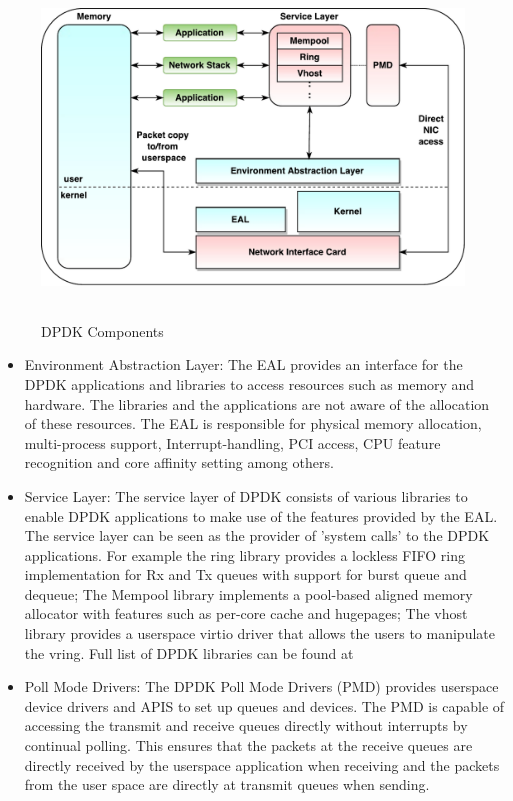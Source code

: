  \begin{figure}[H]
	\centering
	\caption{DPDK Components}
	\includegraphics[height=9cm]{DPDK.pdf}
\end{figure}

\begin{itemize}
	\item Environment Abstraction Layer: The EAL provides an interface for the DPDK applications and libraries to access resources such as memory and hardware. The libraries and the applications are not aware of the allocation of these resources. The EAL is responsible for physical memory allocation, multi-process support, Interrupt-handling, PCI access, CPU feature recognition and core affinity setting among others.
	\item Service Layer: The service layer of DPDK consists of various libraries to enable DPDK applications to make use of the features provided by the EAL. The service layer can be seen as the provider of 'system calls' to the DPDK applications. For example the ring library provides a lockless FIFO ring implementation for Rx and Tx queues with support for burst queue and dequeue; The Mempool library implements a pool-based aligned memory allocator with features such as per-core cache and hugepages; The vhost library provides a userspace virtio driver that allows the users to manipulate the vring. Full list of DPDK libraries can be found at \cite{DPDK}
	\item Poll Mode Drivers: The DPDK Poll Mode Drivers (PMD) provides userspace device drivers and APIS to set up queues and devices. The PMD is capable of accessing the transmit and receive queues directly without interrupts by continual polling. This ensures that the packets at the receive queues are directly received by the userspace application when receiving and the packets from the user space are directly at transmit queues when sending.
\end{itemize}

